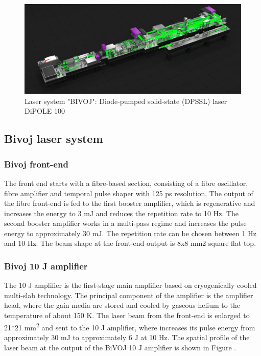 \begin{figure}[h]
    \centering
    \includegraphics[width=1.0\linewidth]{img/bivoj.jpg}
    \caption{Laser system "BIVOJ": Diode-pumped solid-state (DPSSL) laser DiPOLE 100}
    \label{fig:bivoj}
\end{figure}

\subsection{Bivoj laser system}

\subsubsection*{Bivoj front-end}

The front end starts with a fibre-based section, consisting
of a fibre oscillator, fibre amplifier and temporal pulse shaper
with 125 ps resolution. The output of the fibre front-end is fed
to the first booster amplifier, which is regenerative and
increases the energy to 3 mJ and reduces the repetition rate to 10
Hz. The second booster amplifier works in a multi-pass regime
and increases the pulse energy to approximately 30 mJ.
The repetition rate can be chosen between 1 Hz and 10 Hz. The
beam shape at the front-end output is 8x8 mm2 square flat top.

\subsubsection*{Bivoj 10 J amplifier}

The 10 J amplifier is the first-stage main amplifier based on
cryogenically cooled multi-slab technology. The principal
component of the amplifier is the amplifier head, where the
gain media are stored and cooled by gaseous helium to 
the temperature of about 150 K. The laser beam from the front-end
is enlarged to 21*21 mm\textsuperscript{2} and sent to the 10 J amplifier, where
increases its pulse energy from approximately 30 mJ to
approximately 6 J at 10 Hz. The spatial profile of the laser beam at the output of the BiVOJ 10 J amplifier is shown in Figure .

